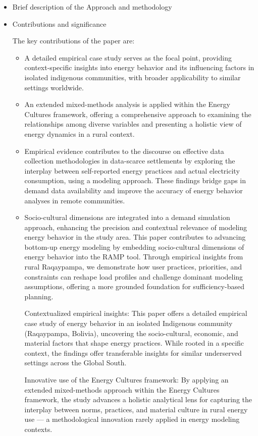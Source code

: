 \documentclass[final,3p,times,onecolumn]{elsarticle}
\begin{document}
\begin{itemize}
    \item Brief description of the Approach and methodology
    \item Contributions and significance
    
    The key contributions of the paper are:
    \begin{itemize}
        \item A detailed empirical case study serves as the focal point, providing context-specific insights into energy behavior and its influencing factors in isolated indigenous communities, with broader applicability to similar settings worldwide.
        \item An extended mixed-methods analysis is applied within the Energy Cultures framework, offering a comprehensive approach to examining the relationships among diverse variables and presenting a holistic view of energy dynamics in a rural context.
        \item Empirical evidence contributes to the discourse on effective data collection methodologies in data-scarce settlements by exploring the interplay between self-reported energy practices and actual electricity consumption, using a modeling approach. These findings bridge gaps in demand data availability and improve the accuracy of energy behavior analyses in remote communities.
        \item Socio-cultural dimensions are integrated into a demand simulation approach, enhancing the precision and contextual relevance of modeling energy behavior in the study area.
    This paper contributes to advancing bottom-up energy modeling by embedding socio-cultural dimensions of energy behavior into the RAMP tool. Through empirical insights from rural Raqaypampa, we demonstrate how user practices, priorities, and constraints can reshape load profiles and challenge dominant modeling assumptions, offering a more grounded foundation for sufficiency-based planning.

    Contextualized empirical insights:
    This paper offers a detailed empirical case study of energy behavior in an isolated Indigenous community (Raqaypampa, Bolivia), uncovering the socio-cultural, economic, and material factors that shape energy practices. While rooted in a specific context, the findings offer transferable insights for similar underserved settings across the Global South.
    
    Innovative use of the Energy Cultures framework:
    By applying an extended mixed-methods approach within the Energy Cultures framework, the study advances a holistic analytical lens for capturing the interplay between norms, practices, and material culture in rural energy use — a methodological innovation rarely applied in energy modeling contexts.
    

\end{itemize}
\end{itemize}
\end{document}
